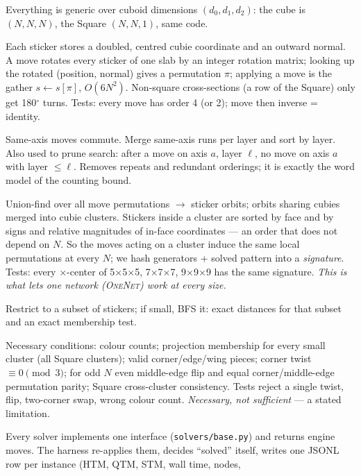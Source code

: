 \documentclass[10.5pt,a4paper]{article}
\newcommand{\Cu}[1]{#1$\times$#1$\times$#1}
\newcommand{\M}[1]{\textsc{#1}}
\begin{document}
Everything is generic over cuboid dimensions $(d_0,d_1,d_2)$: the cube is $(N,N,N)$, the Square $(N,N,1)$, same code.
\begin{description}[style=nextline]
\item[Moves from geometry (\texttt{puzzle.py}, \texttt{moves.py})] Each sticker stores a doubled, centred cubie coordinate and an
outward normal. A move rotates every sticker of one slab by an integer rotation matrix; looking up the rotated (position, normal)
gives a permutation $\pi$; applying a move is the gather $s\leftarrow s[\pi]$, $O(6N^2)$. Non-square cross-sections (a row of the
Square) only get 180$^\circ$ turns. Tests: every move has order 4 (or 2); move then inverse = identity.
\item[Canonical form] Same-axis moves commute. Merge same-axis runs per layer and sort by layer. Also used to prune search: after a
move on axis $a$, layer $\ell$, no move on axis $a$ with layer $\le\ell$. Removes repeats and redundant orderings; it is exactly the
word model of the counting bound.
\item[Clusters with $N$-invariant signatures (\texttt{orbits.py})] Union-find over all move permutations $\to$ sticker orbits;
orbits sharing cubies merged into cubie clusters. Stickers inside a cluster are sorted by face and by signs and relative magnitudes
of in-face coordinates --- an order that does not depend on $N$. So the moves acting on a cluster induce the same local
permutations at every $N$; we hash generators + solved pattern into a \emph{signature}. Tests: every $\times$-center of \Cu{5},
\Cu{7}, \Cu{9} has the same signature. \emph{This is what lets one network (\M{OneNet}) work at every size.}
\item[Projections (\texttt{projection.py})] Restrict to a subset of stickers; if small, BFS it: exact distances for that subset and
an exact membership test.
\item[Solvability checker (\texttt{checker.py})] Necessary conditions: colour counts; projection membership for every small
cluster (all Square clusters); valid corner/edge/wing pieces; corner twist $\equiv 0 \pmod 3$; for odd $N$ even middle-edge flip and
equal corner/middle-edge permutation parity; Square cross-cluster consistency. Tests reject a single twist, flip, two-corner swap,
wrong colour count. \emph{Necessary, not sufficient} --- a stated limitation.
\item[Harness (\texttt{bench/harness.py})] Every solver implements one interface (\texttt{solvers/base.py}) and returns engine
moves. The harness re-applies them, decides ``solved'' itself, writes one JSONL row per instance (HTM, QTM, STM, wall time, nodes,

\end{description}
\end{document}
